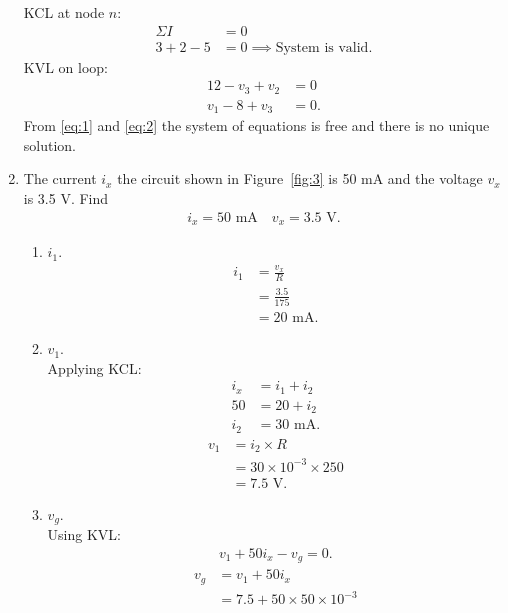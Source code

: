 \documentclass{zc-ust-hw}
\begin{document}
\begin{enumerate}
    KCL at node $n$:
    \begin{align}
      \Sigma I &= 0 \\
      3 + 2 - 5 &= 0 \implies \text{System is valid.}
    \end{align}
    KVL on loop: \\
    \begin{align}
      12 - v_3 + v_2 &= 0 \label{eq:1} \\
      v_1 -8 + v_3 &= 0 \label{eq:2}
    .\end{align}
    From \eqref{eq:1} and \eqref{eq:2} the system of equations is free and there is no unique solution.

    \newpage

  \item The current $i_x$ the circuit shown in Figure~\ref{fig:3} is 50 mA and the voltage
    $v_x$ is 3.5 V. Find
    \begin{align}
      i_x = 50 \text{ mA} \quad v_x = 3.5 \text{ V}
    .\end{align}
    \begin{enumerate}
      \item $i_1$.
    \begin{align}
      i_1 &= \frac{v_x}{R} \\
          &= \frac{3.5}{175} \\
          &= 20 \text{ mA}
    .\end{align}
      \item $v_1$.
    \\Applying KCL:
    \begin{align}
      i_x &= i_1 + i_2 \\
      50 &= 20 + i_2 \\
      i_2 &= 30 \text{ mA}
    .\end{align}
    \begin{align}
      v_1 &= i_2 \times R \\
          &= 30\times 10^{-3} \times 250 \\ 
          &= 7.5 \text{ V}
    .\end{align}
      \item $v_g$.
        \\Using KVL:
        \begin{align}
          v_1 + 50 i_x-v_g  = 0
        .\end{align}
        \begin{align}
          v_g &= v_1 + 50 i_x \\
              &= 7.5 + 50 \times 50 \times 10^{-3} \\

\end{align}
\end{enumerate}
\end{enumerate}
\end{document}

